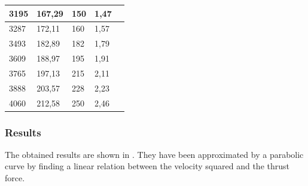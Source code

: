 \begin{table}[H]
\begin{tabular}{|l|l|l|l|p{4.3cm}|}
		\hline%
		3195 						       &  167,29				           & 150                      & 1,47         \\
		\hline%
		3287                               &  172,11   			               & 160                      & 1,57         \\
		\hline%
		3493                               &  182,89                           & 182                      & 1,79         \\
		\hline%
		3609 					           &  188,97	                       & 195                      & 1,91         \\
		\hline%
		3765 						       &  197,13		                   & 215                      & 2,11         \\
		\hline%
		3888 						       &  203,57		                   & 228                      & 2,23         \\
		\hline%
		4060 						       &  212,58		                   & 250                      & 2,46         \\
		\hline%
				
	\end{tabular}
\end{table}
\subsubsection{Results}
The obtained results are shown in . They have been approximated by a parabolic curve by finding a linear relation between the velocity squared and the thrust force.

